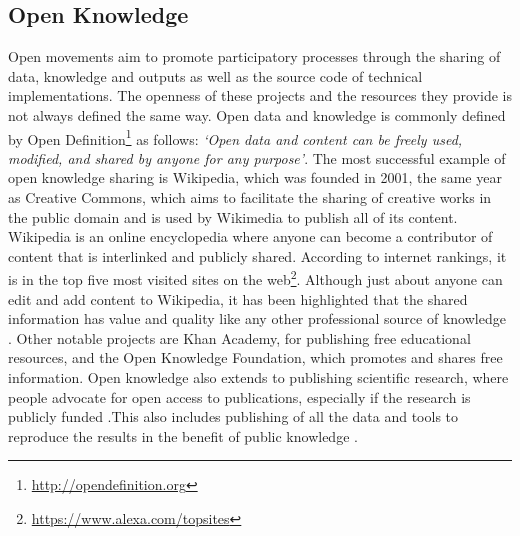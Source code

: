 \subsection{Open Knowledge}
\label{sub:open-knowledge}
Open movements aim to promote participatory processes through the sharing of data, knowledge and outputs as well as the source code of technical implementations. The openness of these projects and the resources they provide is not always defined the same way. Open data and knowledge is commonly defined by Open Definition\footnote{\url{http://opendefinition.org}} as follows: \textit{`Open data and content can be freely used, modified, and shared by anyone for any purpose'}. The most successful example of open knowledge sharing is Wikipedia, which was founded in 2001, the same year as Creative Commons, which aims to facilitate the sharing of creative works in the public domain and is used by Wikimedia to publish all of its content. Wikipedia is an online encyclopedia where anyone can become a contributor of content that is interlinked and publicly shared. According to internet rankings, it is in the top five most visited sites on the web\footnote{\url{https://www.alexa.com/topsites}}. Although just about anyone can edit and add content to Wikipedia, it has been highlighted that the shared information has value and quality like any other professional source of knowledge \citep{giles_internet_2005}. Other notable projects are Khan Academy, for publishing free educational resources, and the Open Knowledge Foundation, which promotes and shares free information. Open knowledge also extends to publishing scientific research, where people advocate for open access to publications, especially if the research is publicly funded \citep{garcia-penalvo_open_2010}.This also includes publishing of all the data and tools to reproduce the results in the benefit of public knowledge \citep{molloy_open_2011}.

